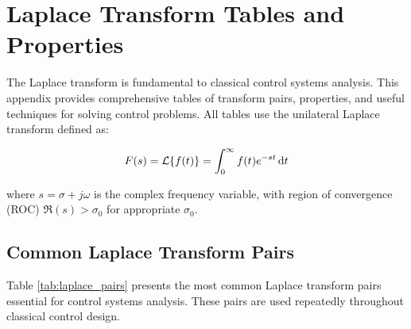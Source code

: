 
\chapter{Laplace Transform Tables and Properties}
\label{app:laplace_tables}

The Laplace transform is fundamental to classical control systems analysis. This appendix provides comprehensive tables of transform pairs, properties, and useful techniques for solving control problems. All tables use the unilateral Laplace transform defined as:

\begin{equation}
    F(s) = \mathcal{L}\{f(t)\} = \int_0^{\infty} f(t) e^{-st} \, \mathrm{d} t
\end{equation}

where $s = \sigma + j\omega$ is the complex frequency variable, with region of convergence (ROC) $\Re(s) > \sigma_0$ for appropriate $\sigma_0$.

\section{Common Laplace Transform Pairs}
\label{sec:laplace_pairs}

Table \ref{tab:laplace_pairs} presents the most common Laplace transform pairs essential for control systems analysis. These pairs are used repeatedly throughout classical control design.

